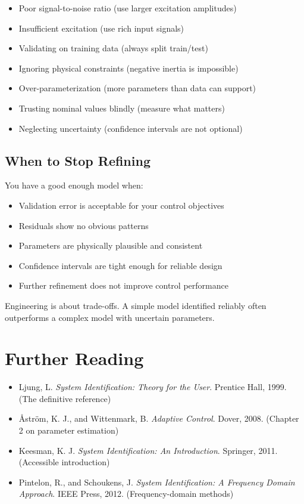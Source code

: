 \begin{itemize}
    \item Poor signal-to-noise ratio (use larger excitation amplitudes)
    \item Insufficient excitation (use rich input signals)
    \item Validating on training data (always split train/test)
    \item Ignoring physical constraints (negative inertia is impossible)
    \item Over-parameterization (more parameters than data can support)
    \item Trusting nominal values blindly (measure what matters)
    \item Neglecting uncertainty (confidence intervals are not optional)
\end{itemize}

\subsection{When to Stop Refining}

You have a good enough model when:
\begin{itemize}
    \item Validation error is acceptable for your control objectives
    \item Residuals show no obvious patterns
    \item Parameters are physically plausible and consistent
    \item Confidence intervals are tight enough for reliable design
    \item Further refinement does not improve control performance
\end{itemize}

Engineering is about trade-offs. A simple model identified reliably often outperforms a complex model with uncertain parameters.

\section{Further Reading}

\begin{itemize}
    \item Ljung, L. \textit{System Identification: Theory for the User}. Prentice Hall, 1999. (The definitive reference)
    \item Åström, K. J., and Wittenmark, B. \textit{Adaptive Control}. Dover, 2008. (Chapter 2 on parameter estimation)
    \item Keesman, K. J. \textit{System Identification: An Introduction}. Springer, 2011. (Accessible introduction)
    \item Pintelon, R., and Schoukens, J. \textit{System Identification: A Frequency Domain Approach}. IEEE Press, 2012. (Frequency-domain methods)
\end{itemize}

